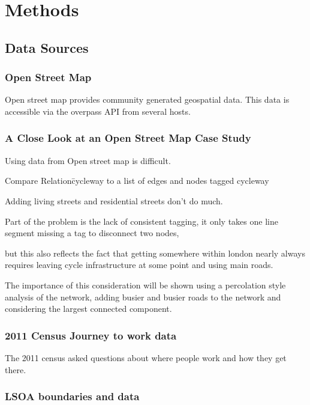 \documentclass[11pt]{article} %
\begin{document}
\section{Methods}

\subsection{Data Sources}

\subsubsection{Open Street Map}

Open street map provides community generated geospatial data. This data is accessible via the overpass API from several hosts. 

\subsubsection{A Close Look at an Open Street Map Case Study}

Using data from Open street map is difficult. 

Compare Relation\= cycleway to a list of edges and nodes tagged cycleway

Adding living streets and residential streets don't do much. 

Part of the problem is the lack of consistent tagging, it only takes one line segment missing a tag to disconnect two nodes,

but this also reflects the fact that getting somewhere within london nearly always requires leaving cycle infrastructure at some point and using main roads. 

The importance of this consideration will be shown using a percolation style analysis of the network, adding busier and busier roads to the network and considering the largest connected component. 

\subsubsection{2011 Census Journey to work data}

The 2011 census asked questions about where people work and how they get there. 

\subsubsection{LSOA boundaries and data}
\end{document}
